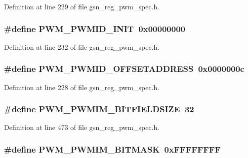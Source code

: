 Definition at line 229 of file gsn\_\-reg\_\-pwm\_\-spec.h.

\hypertarget{a00565_a80e2697233e8ec4bc934b91d8f19e31f}{
\subsubsection[{PWM\_\-PWMID\_\-INIT}]{\setlength{\rightskip}{0pt plus 5cm}\#define PWM\_\-PWMID\_\-INIT~0x00000000}}
\label{a00565_a80e2697233e8ec4bc934b91d8f19e31f}


Definition at line 232 of file gsn\_\-reg\_\-pwm\_\-spec.h.

\hypertarget{a00565_ac7cf84caf366abf45c8bea875af9d9cd}{
\subsubsection[{PWM\_\-PWMID\_\-OFFSETADDRESS}]{\setlength{\rightskip}{0pt plus 5cm}\#define PWM\_\-PWMID\_\-OFFSETADDRESS~0x0000000c}}
\label{a00565_ac7cf84caf366abf45c8bea875af9d9cd}


Definition at line 228 of file gsn\_\-reg\_\-pwm\_\-spec.h.

\hypertarget{a00565_a42dc9b8cc0b60ec94bdd0cb9cc70218c}{
\subsubsection[{PWM\_\-PWMIM\_\-BITFIELDSIZE}]{\setlength{\rightskip}{0pt plus 5cm}\#define PWM\_\-PWMIM\_\-BITFIELDSIZE~32}}
\label{a00565_a42dc9b8cc0b60ec94bdd0cb9cc70218c}


Definition at line 473 of file gsn\_\-reg\_\-pwm\_\-spec.h.

\hypertarget{a00565_ab6518f2d44583d2a58e41caafade7fc8}{
\subsubsection[{PWM\_\-PWMIM\_\-BITMASK}]{\setlength{\rightskip}{0pt plus 5cm}\#define PWM\_\-PWMIM\_\-BITMASK~0xFFFFFFFF}}
\label{a00565_ab6518f2d44583d2a58e41caafade7fc8}


